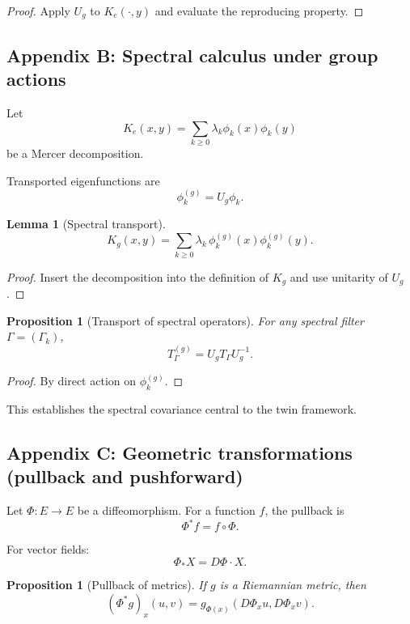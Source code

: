 \documentclass[11pt]{article}
\newtheorem{lemma}[theorem]{Lemma}
\newtheorem{proposition}[theorem]{Proposition}
\theoremstyle{definition}
\begin{document}
\begin{proof}
	Apply $U_g$ to $K_e(\cdot,y)$ and evaluate the reproducing property.
\end{proof}

\subsection{Appendix B: Spectral calculus under group actions}

Let
\[
K_e(x,y)=\sum_{k\ge 0}\lambda_k \phi_k(x)\phi_k(y)
\]
be a Mercer decomposition.

Transported eigenfunctions are
\[
\phi_k^{(g)} = U_g\phi_k.
\]

\begin{lemma}[Spectral transport]
	\[
	K_g(x,y)=\sum_{k\ge 0}\lambda_k\,\phi_k^{(g)}(x)\phi_k^{(g)}(y).
	\]
\end{lemma}

\begin{proof}
	Insert the decomposition into the definition of $K_g$ and use unitarity of $U_g$.
\end{proof}

\begin{proposition}[Transport of spectral operators]
	For any spectral filter $\Gamma=(\Gamma_k)$,
	\[
	T_\Gamma^{(g)} = U_g T_\Gamma U_g^{-1}.
	\]
\end{proposition}

\begin{proof}
	By direct action on $\phi_k^{(g)}$.
\end{proof}

This establishes the spectral covariance central to the twin framework.

\subsection{Appendix C: Geometric transformations (pullback and pushforward)}

Let $\Phi:E\to E$ be a diffeomorphism.  
For a function $f$, the pullback is
\[
\Phi^\ast f = f\circ \Phi.
\]

For vector fields:
\[
\Phi_\ast X = D\Phi\cdot X.
\]

\begin{proposition}[Pullback of metrics]
	If $g$ is a Riemannian metric, then
	\[
	(\Phi^\ast g)_x(u,v)
	= g_{\Phi(x)}(D\Phi_x u, D\Phi_x v).
	\]
\end{proposition}
\end{document}

